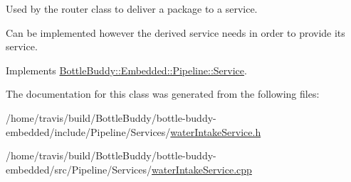 Used by the router class to deliver a package to a service. 

Can be implemented however the derived service needs in order to provide its service. 

Implements \hyperlink{class_bottle_buddy_1_1_embedded_1_1_pipeline_1_1_service_aaa0ee18450e47f2ad51d9934a2d61992}{Bottle\+Buddy\+::\+Embedded\+::\+Pipeline\+::\+Service}.



The documentation for this class was generated from the following files\+:\begin{DoxyCompactItemize}
\item 
/home/travis/build/\+Bottle\+Buddy/bottle-\/buddy-\/embedded/include/\+Pipeline/\+Services/\hyperlink{water_intake_service_8h}{water\+Intake\+Service.\+h}\item 
/home/travis/build/\+Bottle\+Buddy/bottle-\/buddy-\/embedded/src/\+Pipeline/\+Services/\hyperlink{water_intake_service_8cpp}{water\+Intake\+Service.\+cpp}\end{DoxyCompactItemize}
